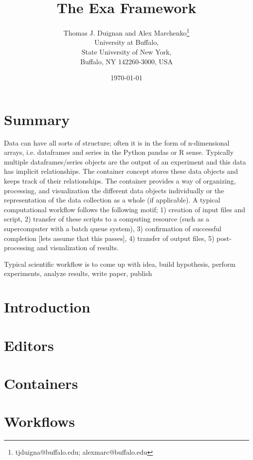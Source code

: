 \documentclass[12pt,letterpaper,oneside,twocolumn]{article}
\begin{document}
\title{\vspace{-4ex}The Exa Framework\vspace{-1ex}}
\author{
	Thomas J. Duignan and Alex Marchenko\footnote{tjduigna@buffalo.edu; alexmarc@buffalo.edu} \\
	University at Buffalo, \\
	State University of New York, \\
	Buffalo, NY 142260-3000, USA \\
}
\date{\vspace{-1ex}\today}
\maketitle

\begin{abstract}
\lipsum[10]
\end{abstract}

\section*{Summary}
Data can have all sorts of structure; often it is in the form of n-dimensional 
arrays, i.e. dataframes and series in the Python pandas or R sense.
Typically multiple dataframes/series objects are the output of an experiment
and this data has implicit relationships. The container concept stores these 
data objects and keeps track of their relationships. The container provides
a way of organizing, processing, and visualization the different data objects
individually or the representation of the data collection as a whole (if 
applicable).
\lipsum[1]
\lipsum[5]
A typical computational workflow follows the following motif; 1) creation of input files and script, 2) transfer of these scripts to a computing resource (such as a supercomputer with a batch queue system), 3) confirmation of successful completion [lets assume that this passes], 4) transfer of output files, 5) post-processing and visualization of results.

Typical scientific workflow is to come up with idea, build hypothesis, perform experiments, analyze results, write paper, publish
\section*{Introduction}
\lipsum[2]
\section*{Editors}
\lipsum[3]
\section*{Containers}
\lipsum[4]
\section*{Workflows}
\lipsum[5]



\end{document}
